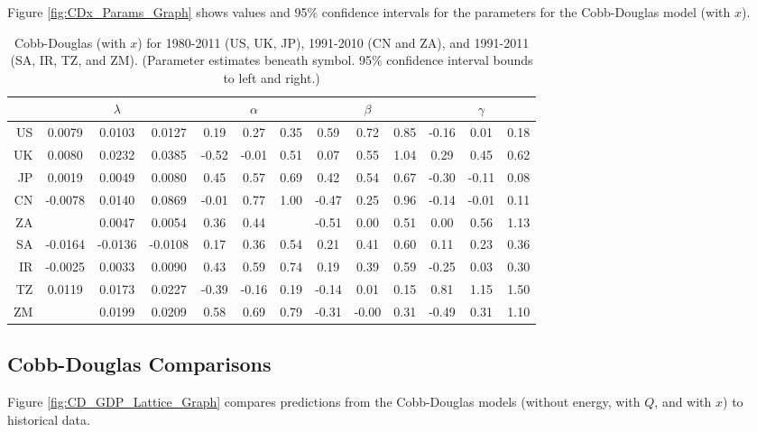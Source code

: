 \documentclass[preprint,authoryear,12pt]{elsarticle}\usepackage{graphicx, color}
\begin{document}
Figure \ref{fig:CDx_Params_Graph} shows values and 95\% confidence intervals for the parameters for the Cobb-Douglas model (with $x$).

\begin{table}[ht]
\begin{center}
\caption{Cobb-Douglas (with $x$) for 1980-2011 (US, UK, JP), 1991-2010 (CN and ZA), and 1991-2011 (SA, IR, TZ, and ZM). (Parameter estimates beneath symbol. 95\% confidence interval bounds to left and right.)}
\label{tab:CD_Parameters_With_X}
{\tiny
\begin{tabular}{r|ccc|ccc|ccc|ccc}
  \hline
 &   & $\lambda$ &   &   & $\alpha$ &   &   & $\beta$ &   &   & $\gamma$ &   \\ 
  \hline
US & 0.0079 & 0.0103 & 0.0127 & 0.19 & 0.27 & 0.35 & 0.59 & 0.72 & 0.85 & -0.16 & 0.01 & 0.18 \\ 
  UK & 0.0080 & 0.0232 & 0.0385 & -0.52 & -0.01 & 0.51 & 0.07 & 0.55 & 1.04 & 0.29 & 0.45 & 0.62 \\ 
  JP & 0.0019 & 0.0049 & 0.0080 & 0.45 & 0.57 & 0.69 & 0.42 & 0.54 & 0.67 & -0.30 & -0.11 & 0.08 \\ 
  CN & -0.0078 & 0.0140 & 0.0869 & -0.01 & 0.77 & 1.00 & -0.47 & 0.25 & 0.96 & -0.14 & -0.01 & 0.11 \\ 
  ZA &  & 0.0047 & 0.0054 & 0.36 & 0.44 &  & -0.51 & 0.00 & 0.51 & 0.00 & 0.56 & 1.13 \\ 
  SA & -0.0164 & -0.0136 & -0.0108 & 0.17 & 0.36 & 0.54 & 0.21 & 0.41 & 0.60 & 0.11 & 0.23 & 0.36 \\ 
  IR & -0.0025 & 0.0033 & 0.0090 & 0.43 & 0.59 & 0.74 & 0.19 & 0.39 & 0.59 & -0.25 & 0.03 & 0.30 \\ 
  TZ & 0.0119 & 0.0173 & 0.0227 & -0.39 & -0.16 & 0.19 & -0.14 & 0.01 & 0.15 & 0.81 & 1.15 & 1.50 \\ 
  ZM &  & 0.0199 & 0.0209 & 0.58 & 0.69 & 0.79 & -0.31 & -0.00 & 0.31 & -0.49 & 0.31 & 1.10 \\ 
   \hline
\end{tabular}
}
\end{center}
\end{table}



\subsection{Cobb-Douglas Comparisons}

Figure \ref{fig:CD_GDP_Lattice_Graph} compares predictions from the Cobb-Douglas models (without energy, with $Q$, and with $x$) to historical data.
\end{document}
